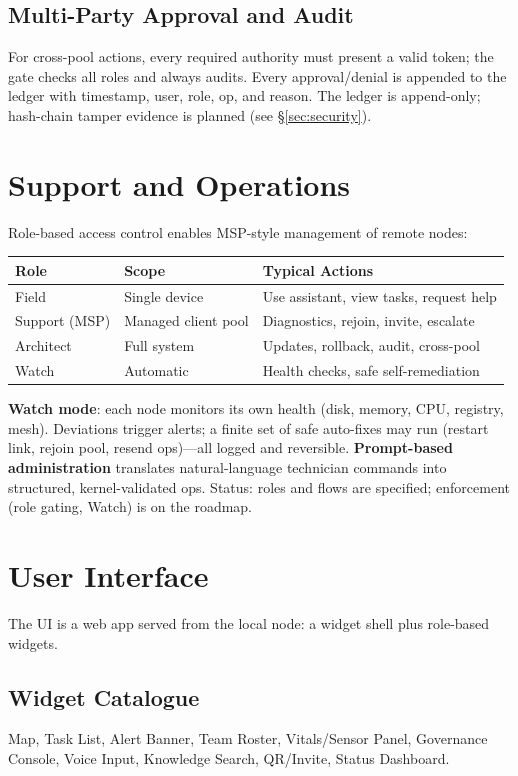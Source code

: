 \documentclass[11pt,a4paper]{article}
\begin{document}
\subsection{Multi-Party Approval and Audit}
For cross-pool actions, every required authority must present a valid token; the gate checks all roles and always audits. Every approval/denial is appended to the ledger with timestamp, user, role, op, and reason. The ledger is append-only; hash-chain tamper evidence is planned (see \S\ref{sec:security}).

\section{Support and Operations}
\label{sec:support}
Role-based access control enables MSP-style management of remote nodes:

\begin{center}
\begin{tabularx}{\textwidth}{l l X}
\toprule
\textbf{Role} & \textbf{Scope} & \textbf{Typical Actions} \\
\midrule
Field & Single device & Use assistant, view tasks, request help \\
Support (MSP) & Managed client pool & Diagnostics, rejoin, invite, escalate \\
Architect & Full system & Updates, rollback, audit, cross-pool \\
Watch & Automatic & Health checks, safe self-remediation \\
\bottomrule
\end{tabularx}
\end{center}

\textbf{Watch mode}: each node monitors its own health (disk, memory, CPU, registry, mesh). Deviations trigger alerts; a finite set of safe auto-fixes may run (restart link, rejoin pool, resend ops)---all logged and reversible. \textbf{Prompt-based administration} translates natural-language technician commands into structured, kernel-validated ops. Status: roles and flows are specified; enforcement (role gating, Watch) is on the roadmap.

\section{User Interface}
\label{sec:ui}
The UI is a web app served from the local node: a widget shell plus role-based widgets.

\subsection{Widget Catalogue}
Map, Task List, Alert Banner, Team Roster, Vitals/Sensor Panel, Governance Console, Voice Input, Knowledge Search, QR/Invite, Status Dashboard.
\end{document}
